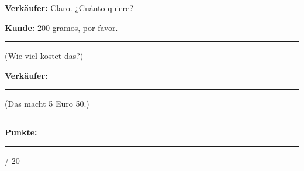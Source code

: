 \documentclass[11pt, a4paper]{article}
\newcommand{\maxpunkte}{20}
\newcommand{\luecke}[1]{\rule{#1}{0.4pt}}
\begin{document}
\noindent
\textbf{Verkäufer:} Claro. ¿Cuánto quiere?

\vspace{0.8em}

\noindent
\textbf{Kunde:} 200 gramos, por favor. \luecke{4cm} (Wie viel kostet das?)

\vspace{0.8em}

\noindent
\textbf{Verkäufer:} \luecke{6cm} (Das macht 5 Euro 50.)


\vspace{20pt}
\hrule
\vspace{10pt}

\begin{flushright}
\textbf{Punkte:} \luecke{1cm} / \maxpunkte
\end{flushright}
\end{document}
